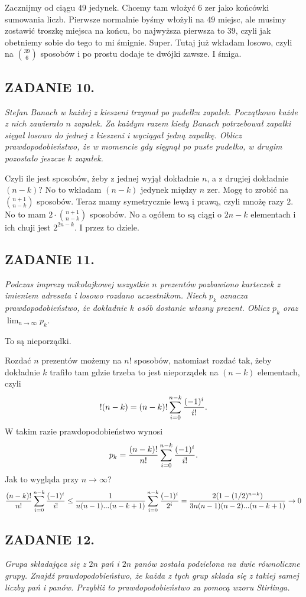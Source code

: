 \documentclass{article}
\begin{document}
Zacznijmy od ciągu $49$ jedynek. Chcemy tam włożyć $6$ zer jako końcówki sumowania liczb. Pierwsze normalnie byśmy włożyli na $49$ miejsc, ale musimy zostawić troszkę miejsca na końcu, bo najwyższa pierwsza to $39$, czyli jak obetniemy sobie do tego to mi śmignie. Super. Tutaj już wkładam losowo, czyli na ${39\choose 6}$ sposobów i po prostu dodaje te dwójki zawsze. I śmiga.

\subsection*{ZADANIE 10.}
\emph{Stefan Banach w każdej z kieszeni trzymał po pudełku zapałek. Początkowo każde z nich zawierało $n$ zapałek. Za każdym razem kiedy Banach potrzebował zapałki sięgał losowo do jednej z kieszeni i wyciągał jedną zapałkę. Oblicz prawdopodobieństwo, że w momencie gdy sięgnął po puste pudełko, w drugim pozostało jeszcze $k$ zapałek.}
\smallskip

Czyli ile jest sposobów, żeby z jednej wyjął dokładnie $n$, a z drugiej dokładnie $(n-k)$? No to wkładam $(n-k)$ jedynek między $n$ zer. Mogę to zrobić na ${n+1\choose n-k}$ sposobów. Teraz mamy symetrycznie lewą i prawą, czyli mnożę razy $2$. No to mam $2\cdot{n+1\choose n-k}$ sposobów. No a ogółem to są ciągi o $2n-k$ elementach i ich chuji jest $2^{2n-k}$. I przez to dziele.

\subsection*{ZADANIE 11.}
\emph{Podczas imprezy mikołajkowej wszystkie $n$ prezentów pozbawiono karteczek z imieniem adresata i losowo rozdano uczestnikom. Niech $p_k$ oznacza prawdopodobieństwo, że dokładnie $k$ osób dostanie własny prezent. Oblicz $p_k$ oraz $\lim_{n\to\infty}p_k$.}
\smallskip

To są nieporządki.

Rozdać $n$ prezentów możemy na $n!$ sposobów, natomiast rozdać tak, żeby dokładnie $k$ trafiło tam gdzie trzeba to jest nieporządek na $(n-k)$ elementach, czyli
$$!(n-k)=(n-k)!\sum\limits_{i=0}^{n-k}{(-1)^i\over i!}.$$
W takim razie prawdopodobieństwo wynosi
$$p_k={(n-k)!\over n!}\sum\limits_{i=0}^{n-k}{(-1)^i\over i!}.$$
Jak to wygląda przy $n\to\infty$?
$${(n-k)!\over n!}\sum\limits_{i=0}^{n-k}{(-1)^i\over i!}\leq {1\over n(n-1)...(n-k+1)}\sum\limits_{i=0}^{n-k}{(-1)^i\over 2^i}={2(1-(1/2)^{n-k})\over 3n(n-1)(n-2)...(n-k+1)}\to 0$$

\subsection*{ZADANIE 12.}
\emph{Grupa składająca się z $2n$ pań i $2n$ panów została podzielona na dwie równoliczne grupy. Znajdź prawdopodobieństwo, że każda z tych grup składa się z takiej samej liczby pań i panów. Przybliż to prawdopodobieństwo za pomocą wzoru Stirlinga.}
\medskip
\end{document}
